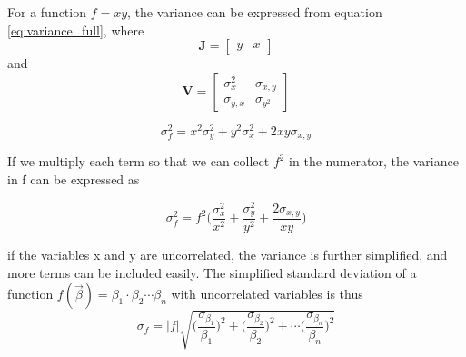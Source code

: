 \documentclass[a4paper,11pt,twoside]{book}
\begin{document}
\noindent 
For a function $f=xy $, the variance can be expressed from equation \ref{eq:variance_full}, where  $$\mathbf{J}=\begin{bmatrix}y & x \end{bmatrix}$$ and $$\mathbf{V}=\begin{bmatrix} \sigma_x^2 & \sigma_{x,y}\\\sigma_{y,x} & \sigma_{y^2} \end{bmatrix}$$ 

\begin{equation}
    \sigma_f^2 = x^2\sigma_y^2 + y^2\sigma_x^2 + 2 xy \sigma_{x,y}
\end{equation}

\noindent If we multiply each term so that we can collect $f^2$ in the numerator, the variance in f can be expressed as 

\begin{equation}
    \sigma_f^2 = f^2 \big( \frac{\sigma_x^2}{x^2} + \frac{\sigma_y^2}{y^2} + \frac{2\sigma_{x,y}}{xy} \Big)
\end{equation}

\noindent if the variables x and y are uncorrelated, the variance is further simplified, and more terms can be included easily. The simplified standard deviation of a function $f(\vec{\beta})=\beta_1 \cdot \beta_2 \cdots \beta_n $ with uncorrelated variables is thus
\begin{equation} \label{eq:uncertainty_simplification}
    \sigma_f = |f|\sqrt{ \Big( \frac{\sigma_{\beta_1}}{\beta_1}\Big)^2 +  \Big( \frac{\sigma_{\beta_2}}{\beta_2}\Big)^2 + \cdots  \Big( \frac{\sigma_{\beta_n}}{\beta_n}\Big)^2    } 
\end{equation}






\end{document}
